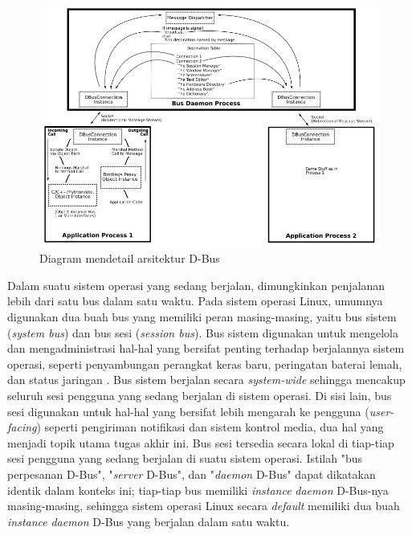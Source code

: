 \begin{figure}
    \centering
    \includegraphics[width=1\linewidth]{contents//chapter-2/dbus-diagram.png}
    \caption{Diagram mendetail arsitektur D-Bus \cite{dbus-main-project-page}}
    \label{fig:enter-label}
\end{figure}

Dalam suatu sistem operasi yang sedang berjalan, dimungkinkan penjalanan lebih dari satu bus dalam satu waktu. Pada sistem operasi Linux, umumnya digunakan dua buah bus yang memiliki peran masing-masing, yaitu bus sistem (\textit{system bus}) dan bus sesi (\textit{session bus}). Bus sistem digunakan untuk mengelola dan mengadministrasi hal-hal yang bersifat penting terhadap berjalannya sistem operasi, seperti penyambungan perangkat keras baru, peringatan baterai lemah, dan status jaringan \cite{will2020trusted}. Bus sistem berjalan secara \textit{system-wide} sehingga mencakup seluruh sesi pengguna yang sedang berjalan di sistem operasi. Di sisi lain, bus sesi digunakan untuk hal-hal yang bersifat lebih mengarah ke pengguna (\textit{user-facing}) seperti pengiriman notifikasi dan sistem kontrol media, dua hal yang menjadi topik utama tugas akhir ini. Bus sesi tersedia secara lokal di tiap-tiap sesi pengguna yang sedang berjalan di suatu sistem operasi. Istilah "bus perpesanan D-Bus", "\textit{server} D-Bus", dan "\textit{daemon} D-Bus" dapat dikatakan identik dalam konteks ini; tiap-tiap bus memiliki \textit{instance} \textit{daemon} D-Bus-nya masing-masing, sehingga sistem operasi Linux secara \textit{default} memiliki dua buah \textit{instance} \textit{daemon} D-Bus yang berjalan dalam satu waktu.

